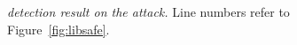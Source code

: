 \begin{figure}
  \centering
  \mbox{}
  \vspace{-.1in}
  \caption{{\em \xxx detection result on the \libsafe attack.} \rm {Line 
numbers refer to Figure~\ref{fig:libsafe}.} 
  \vspace{-.2in}
  }
  \label{fig:libsafe_result}
\end{figure}

% 


